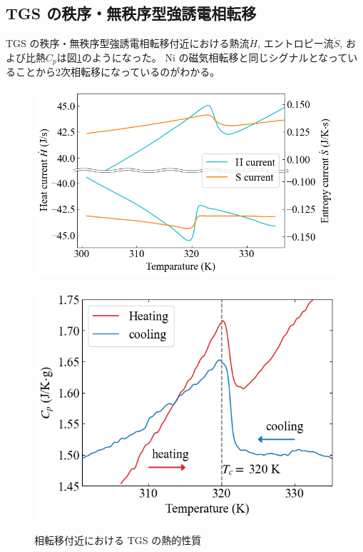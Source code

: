 \documentclass[9pt,dvipdfmx,a4paper]{jsarticle}
\begin{document}
\subsection{TGS の秩序・無秩序型強誘電相転移}
TGS の秩序・無秩序型強誘電相転移付近における熱流\(\dot{H}\), エントロピー流\(\dot{S}\), および比熱\(C_p\)は図\ref{graph:TGS}のようになった。
Ni の磁気相転移と同じシグナルとなっていることから2次相転移になっているのがわかる。

\begin{figure}[hbt]
    \centering
    \begin{minipage}[t]{0.51\columnwidth}
        \centering
        \includegraphics[width = \columnwidth]{result/TGS-current.png}
        \label{graph:TGS-current}
    \end{minipage}
    \hfill
    \begin{minipage}[t]{0.43\columnwidth}
        \centering
        \includegraphics[width = \columnwidth]{result/TGS-Cp.png}
        \label{graph:TSG-Cp}
    \end{minipage}
    \caption{相転移付近における TGS の熱的性質}
    \label{graph:TGS}
\end{figure}
\end{document}
